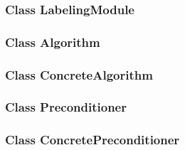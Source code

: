 \documentclass[parskip=full]{scrartcl}
\begin{document}
\subsubsection{Class LabelingModule}
\subsubsection{Class Algorithm}
\subsubsection{Class ConcreteAlgorithm}
\subsubsection{Class Preconditioner}
\subsubsection{Class ConcretePreconditioner}
\end{document}
